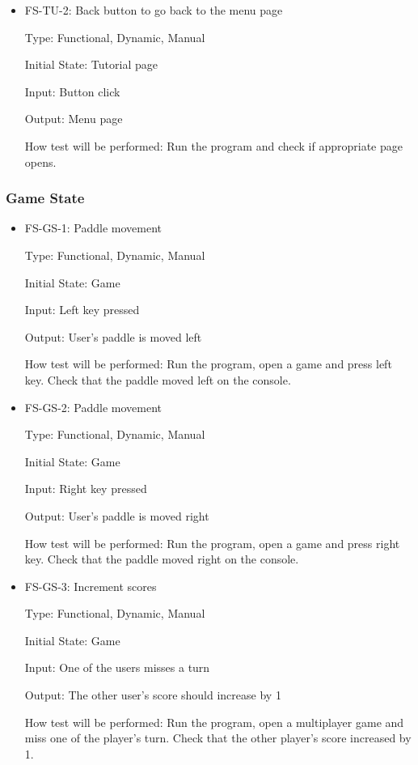 \documentclass[12pt,letterpaper]{article}
\begin{document}
\begin{reqbox}
	\begin{itemize}
	\item FS-TU-2: Back button to go back to the menu page

	Type: Functional, Dynamic, Manual

	Initial State: Tutorial page	

	Input: Button click

	Output: Menu page

	How test will be performed: Run the program and check if appropriate page opens.
	\end{itemize}
\end{reqbox}

	\subsubsection{Game State}
\begin{reqbox}
	\begin{itemize}
	\item FS-GS-1: Paddle movement

	Type: Functional, Dynamic, Manual

	Initial State: Game 

	Input: Left key pressed

	Output: User’s paddle is moved left

	How test will be performed: Run the program, open a game and press left key. Check that the paddle moved left on the console.
	\end{itemize}
\end{reqbox}

\begin{reqbox}
	\begin{itemize}
	\item FS-GS-2: Paddle movement

	Type: Functional, Dynamic, Manual

	Initial State: Game 

	Input: Right key pressed

	Output: User’s paddle is moved right

	How test will be performed: Run the program, open a game and press right key. Check that the paddle moved right on the console.
	\end{itemize}
\end{reqbox}

\begin{reqbox}
	\begin{itemize}
	\item FS-GS-3: Increment scores

	Type: Functional, Dynamic, Manual

	Initial State: Game 

	Input: One of the users misses a turn

	Output: The other user’s score should increase by 1

	How test will be performed: Run the program, open a multiplayer game and miss one of the player’s turn. Check that the other player’s score increased by 1.
	\end{itemize}
\end{reqbox}
\end{document}
